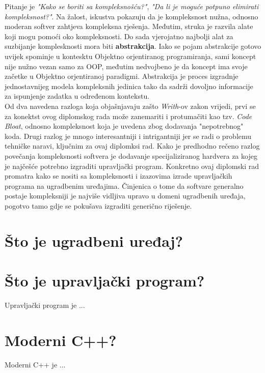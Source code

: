 Pitanje je \textit{"Kako se boriti sa kompleksnošću?"}, \textit{"Da li je moguće potpuno elimirati kompleksnost?"}. Na žalost, iskustva pokazuju da je kompleksnost nužna, odnosno moderan softver zahtjeva kompleksna rješenja. Međutim, struka je razvila alate koji mogu pomoći oko kompleksnosti. Do sada vjerojatno najbolji alat za suzbijanje komplesknosti mora biti \textbf{abstrakcija}. Iako se pojam abstrakcije gotovo uvijek spominje u kontesktu Objektno orjentiranog programiranja, sami koncept nije nužno vezan samo za OOP, međutim nedvojbeno je da koncept ima svoje začetke u Objektno orjentiranoj paradigmi. Abstrakcija je proces izgradnje jednostavnijeg modela kompleksnih jedinica tako da sadrži dovoljno informacije za ispunjenje zadatka u određenom kontekstu. \\   

Od dva navedena razloga koja objašnjavaju zašto \textit{Writh}-ov zakon vrijedi, prvi se za konektst ovog diplomskog rada može zanemariti i protumačiti kao tzv. \textit{Code Bloat}, odnosno kompleksnost koja je uvedena zbog dodavanja "nepotrebnog" koda. Drugi razlog je mnogo interesantniji i intrigantniji jer se radi o problemu tehničke naravi, ključnim za ovaj diplomksi rad. Kako je predhodno rečeno razlog povečanja kompleksnosti softvera je dodavanje specijaliziranog hardvera za kojeg je najčešće potrebno izgraditi upravljački program. Konkretno ovaj diplomski rad promatra kako se nositi sa kompleksnosti i izazovima izrade upravljačkih programa na ugradbenim uređajima. Činjenica o tome da softvare generalno postaje kompleksniji je najviše vidljiva upravo u domeni ugradbenih uređaja, pogotvo tamo gdje se pokušava izgraditi generično riješenje. 
\pagebreak

\section{Što je ugradbeni uređaj?}


\section{Što je upravljački program?}
Upravljački program je ...

\section{Moderni C++?}
Moderni C++ je ...
